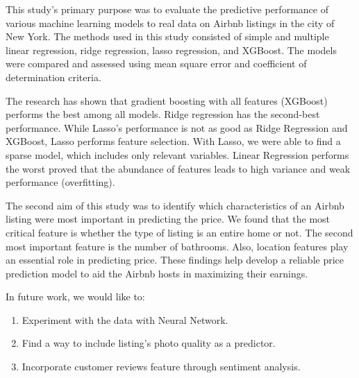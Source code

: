 This study's primary purpose was to evaluate the predictive performance of
various machine learning models to real data on Airbnb listings in the city of
New York.  The methods used in this study consisted of simple and multiple
linear regression, ridge regression, lasso regression, and XGBoost. The models
were compared and assessed using mean square error and coefficient of
determination criteria.

The research has shown that gradient boosting with all features (XGBoost) performs
the best among all models. Ridge regression has the second-best performance.
While Lasso's performance is not as good as Ridge Regression and XGBoost, Lasso
performs feature selection. With Lasso, we were able to find a sparse model,
which includes only relevant variables.
Linear Regression performs the worst proved that the abundance of features leads
to high variance and weak performance (overfitting).

The second aim of this study was to identify which characteristics of an Airbnb
listing were most important in predicting the price. We found that the most
critical feature is whether the type of listing is an entire home or not. The
second most important feature is the number of bathrooms. Also, location
features play an essential role in predicting price. These findings help
develop a reliable price prediction model to aid the Airbnb hosts in maximizing
their earnings.

In future work, we would like to:
\begin{enumerate}
  \item Experiment with the data with Neural Network.
  \item Find a way to include listing's photo quality as a predictor.
  \item Incorporate customer reviews feature through sentiment analysis.
\end{enumerate}
